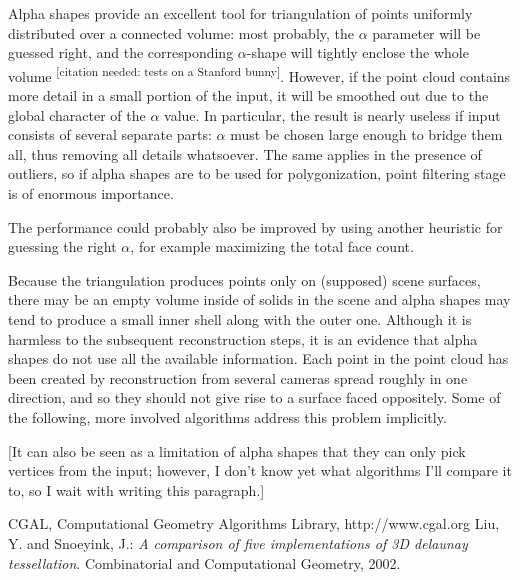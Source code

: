 \documentclass[12pt]{article}
\begin{document}
Alpha shapes provide an excellent tool for triangulation of points uniformly distributed over a connected volume: most probably, the $\alpha$ parameter will be guessed right, and the corresponding $\alpha$-shape will tightly enclose the whole volume \textsuperscript{[citation needed: tests on a Stanford bunny]}. However, if the point cloud contains more detail in a small portion of the input, it will be smoothed out due to the global character of the $\alpha$ value. In particular, the result is nearly useless if input consists of several separate parts: $\alpha$ must be chosen large enough to bridge them all, thus removing all details whatsoever. The same applies in the presence of outliers, so if alpha shapes are to be used for polygonization, point filtering stage is of enormous importance.

The performance could probably also be improved by using another heuristic for guessing the right $\alpha$, for example maximizing the total face count.

Because the triangulation produces points only on (supposed) scene surfaces, there may be an empty volume inside of solids in the scene and alpha shapes may tend to produce a small inner shell along with the outer one. Although it is harmless to the subsequent reconstruction steps, it is an evidence that alpha shapes do not use all the available information. Each point in the point cloud has been created by reconstruction from several cameras spread roughly in one direction, and so they should not give rise to a surface faced oppositely. Some of the following, more involved algorithms address this problem implicitly.

[It can also be seen as a limitation of alpha shapes that they can only pick vertices from the input; however, I don't know yet what algorithms I'll compare it to, so I wait with writing this paragraph.]

\begin{thebibliography}{9}
	CGAL,
	Computational Geometry Algorithms Library,
	http://www.cgal.org 
  Liu, Y. and Snoeyink, J.:
  \emph{A comparison of five implementations of 3D delaunay tessellation}.
  Combinatorial and Computational Geometry,
  2002.

\end{thebibliography}
\end{document}
